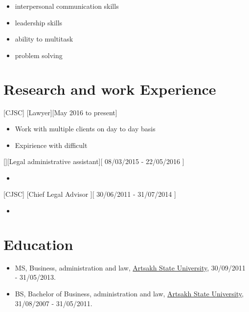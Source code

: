 \documentclass{article}
\begin{document}
\begin{itemize}
\item interpersonal communication skills
\item leadership skills
\item ability to multitask
\item problem solving 
\end{itemize}

\section{Research and work Experience}
 

 
[CJSC]
[Lawyer][May 2016 to present]
   \begin{itemize}
   \item Work  with multiple clients on day to day basis
   \item Expirience with difficult 
   \end{itemize}

[][Legal administrative assistant][ 08/03/2015 - 22/05/2016 ]
\begin{itemize}
   \item 
   \end{itemize}

[CJSC]
[Chief Legal Advisor ][ 30/06/2011 - 31/07/2014 ]

\begin{itemize}
\item 
\end{itemize}
 

 
 
\section{Education}
 
\begin{itemize}
\item MS, Business, administration and law, \href{http://www.asu.am/}{Artsakh State University},  30/09/2011 - 31/05/2013.
\item BS, Bachelor of Business, administration and law, \href{http://www.asu.am/}{Artsakh State University}, 31/08/2007 - 31/05/2011.
\end{itemize}

 
\end{document}

